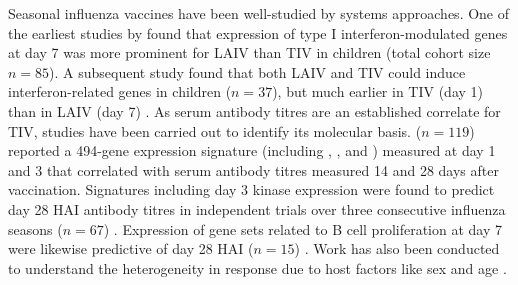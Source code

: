 Seasonal influenza vaccines have been well-studied by systems approaches.
One of the earliest studies by \textcite{zhu2010WholeGenomeTranscriptional} found that expression of type I interferon-modulated genes at day 7 was more prominent for \gls{LAIV} than \gls{TIV} in children (total cohort size $n=85$).
A subsequent study found that both \gls{LAIV} and \gls{TIV} could induce interferon-related genes in children ($n=37$), but much earlier in \gls{TIV} (day 1) than in \gls{LAIV} (day 7) \autocite{cao2014DifferencesAntibodyResponses}.
As serum antibody titres are an established correlate for \gls{TIV}, studies have been carried out to identify its molecular basis.
\textcite{bucasas2011EarlyPatternsGene} ($n=119$) reported a 494-gene expression signature (including , , and ) measured at day 1 and 3 that correlated with serum antibody titres measured 14 and 28 days after vaccination.
Signatures including day 3 kinase  expression were found to predict day 28 \gls{HAI} antibody titres in independent trials over three consecutive influenza seasons ($n=67$) \autocite{nakaya2011SystemsBiologyVaccination}.
Expression of gene sets related to B cell proliferation at day 7 were likewise predictive of day 28 \gls{HAI} ($n=15$) \autocite{tan2014GeneSignaturesRelated}.
Work has also been conducted to understand the heterogeneity in response due to host factors like 
sex \autocite{furman2014SystemsAnalysisSex}
and age \autocite{frasca2010IntrinsicDefectsCell,nakaya2015SystemsAnalysisImmunity,nakaya2016SystemsBiologyImmunity,hipc-chisignaturesprojectteam2017MulticohortAnalysisReveals}.
%

